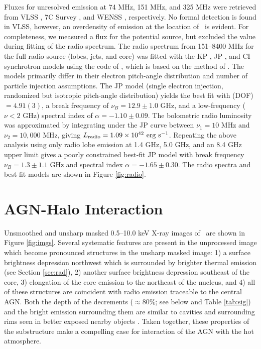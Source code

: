 \documentclass[useAMS,usenatbib]{mn2e}
\begin{document}
Fluxes for unresolved emission at 74 MHz, 151 MHz, and 325 MHz were
retrieved from VLSS \citep{vlss}, 7C Survey
\citep{1999MNRAS.306...31R}, and WENSS \citep{1997A&AS..124..259R},
respectively. No formal detection is found in VLSS, however, an
overdensity of emission at the location of \irs\ is evident. For
completeness, we measured a flux for the potential source, but
excluded the value during fitting of the radio spectrum. The radio
spectrum from 151--8400 MHz for the full radio source (lobes, jets,
and core) was fitted with the KP \citep{1962SvA.....6..317K, pach}, JP
\citep{1973A&A....26..423J}, and CI \citep{1987MNRAS.225..335H}
synchrotron models using the code of \citet{2005ApJ...624..656W},
which is based on the method of \citet{1991ApJ...383..554C}. The
models primarily differ in their electron pitch-angle distribution and
number of particle injection assumptions. The JP model (single
electron injection, randomized but isotropic pitch-angle distribution)
yields the best fit with \chisq(DOF)$ = 4.91(3)$, a break frequency of
$\nu_B = 12.9 \pm 1.0$ GHz, and a low-frequency ($\nu < 2$ GHz)
spectral index of $\alpha = -1.10 \pm 0.09$. The bolometric radio
luminosity was approximated by integrating under the JP curve between
$\nu_1 = 10$ MHz and $\nu_2 = 10,000$ MHz, giving $L_{\rm{radio}} = 1.09 \times
10^{42}~\rm{\mbox{\ensuremath{\rm{erg}}}~\ensuremath{\rm{\mbox{\ensuremath{\rm{s}}}^{-1}}}}$. Repeating the above analysis using only radio lobe
emission at 1.4 GHz, 5.0 GHz, and an 8.4 GHz upper limit gives a
poorly constrained best-fit JP model with break frequency $\nu_B = 1.3
\pm 1.1$ GHz and spectral index $\alpha = -1.65 \pm 0.30$. The radio
spectra and best-fit models are shown in Figure \ref{fig:radio}.

\section{AGN-Halo Interaction}
\label{sec:sub}

Unsmoothed and unsharp masked 0.5--10.0 keV X-ray images of \irs\ are
shown in Figure \ref{fig:imgs}. Several systematic features are
present in the unprocessed image which become pronounced structures in
the unsharp masked image: 1) a surface brightness depression northwest
which is surrounded by brighter thermal emission (see Section
\ref{sec:rad}), 2) another surface brightness depression southeast of
the core, 3) elongation of the core emission to the northeast of the
nucleus, and 4) all of these structures are coincident with radio
emission traceable to the central AGN. Both the depth of the
decrements ($\approx 80\%$; see below and Table \ref{tab:sig}) and the
bright emission surrounding them are similar to cavities and
surrounding rims seen in better exposed nearby objects
\citep[\eg][]{2009MNRAS.396.1449S}. Taken together, these properties
of the substructure make a compelling case for interaction of the AGN
with the hot atmosphere.
\end{document}
